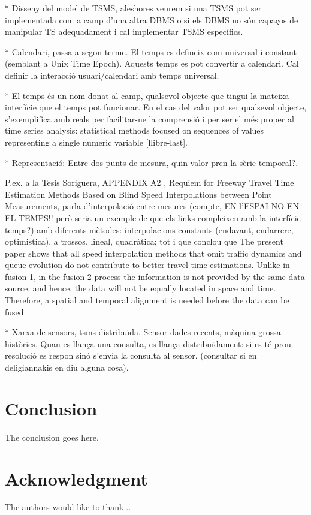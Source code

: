 \documentclass[
conference, %
]{IEEEtran}
\begin{document}
* Disseny del model de TSMS, aleshores veurem si una TSMS pot ser implementada com a camp d'una altra DBMS o si els DBMS no són capaços de manipular TS adequadament i cal implementar TSMS específics.

* Calendari, passa a segon terme. El temps es defineix com universal i constant (semblant a Unix Time Epoch). Aquests temps es pot convertir a calendari. Cal definir la interacció usuari/calendari amb temps universal.

* El temps és un nom donat al camp, qualsevol objecte que tingui la mateixa interfície que el temps pot funcionar. En el cas del valor pot ser qualsevol objecte, s'exemplifica amb reals per facilitar-ne la comprensió i per ser el més proper al time series analysis: statistical methods focused on sequences of values representing a single numeric variable [llibre-last].


* Representació: Entre dos punts de mesura, quin valor pren la sèrie temporal?.





 P.ex. a la Tesis Soriguera, APPENDIX A2 , 
Requiem for Freeway Travel Time Estimation Methods Based
on Blind Speed Interpolations between Point Measurements, parla d'interpolació entre mesures (compte, EN l'ESPAI NO EN EL TEMPS!! però seria un exemple de que els links compleixen amb la interfície temps?) amb diferents mètodes:  interpolacions constants (endavant, endarrere, optimistica), a trossos, lineal, quadràtica;    tot i que conclou que The present paper shows that all speed interpolation methods that omit traffic
dynamics and queue evolution do not contribute to better travel time estimations. 
Unlike in fusion 1, in the fusion 2 process the information is not provided by the same
data source, and hence, the data will not be equally located in space and time. 
Therefore, a spatial and temporal alignment is needed before the data can be fused.


* Xarxa de sensors, tsms distribuïda. Sensor dades recents, màquina grossa històrics. Quan es llança una consulta, es llança distribuïdament: si es té prou resolució es respon sinó s'envia la consulta al sensor. (consultar si en deligiannakis en diu alguna cosa).



\newpage

\mbox{}

\newpage





\section{Conclusion}
The conclusion goes here.


\section*{Acknowledgment}


The authors would like to thank...
\end{document}
